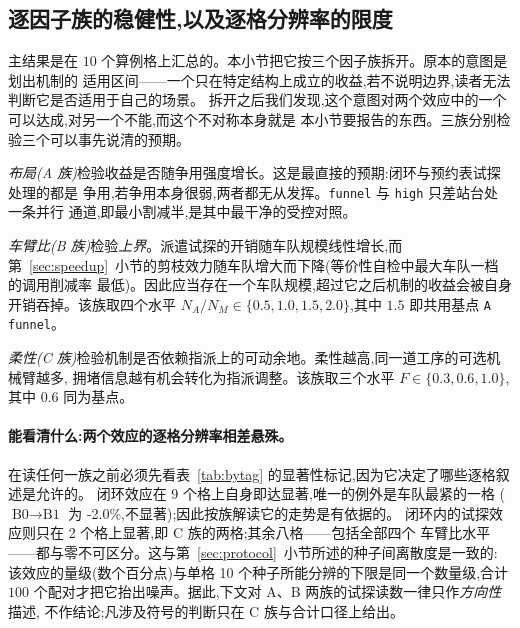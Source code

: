 \documentclass[manuscript,screen,review]{acmart}
\newcommand{\NCases}{10}
\newcommand{\NSeeds}{10}
\newcommand{\NPairs}{100}
\newcommand{\CellsSigLoop}{9}
\newcommand{\CellsSigProbe}{2}
\newcommand{\GainLoopStarve}{-2.0\%}     %
\begin{document}
\subsection{逐因子族的稳健性,以及逐格分辨率的限度}
\label{sec:whichcongestion}

主结果是在 $\NCases$ 个算例格上汇总的。本小节把它按三个因子族拆开。原本的意图是划出机制的
适用区间——一个只在特定结构上成立的收益,若不说明边界,读者无法判断它是否适用于自己的场景。
拆开之后我们发现,这个意图对两个效应中的一个可以达成,对另一个不能,而这个不对称本身就是
本小节要报告的东西。三族分别检验三个可以事先说清的预期。

\emph{布局(A 族)}检验收益是否随争用强度增长。这是最直接的预期:闭环与预约表试探处理的都是
争用,若争用本身很弱,两者都无从发挥。\texttt{funnel} 与 \texttt{high} 只差站台处一条并行
通道,即最小割减半,是其中最干净的受控对照。

\emph{车臂比(B 族)}检验\emph{上界}。派遣试探的开销随车队规模线性增长,而
第~\ref{sec:speedup}~小节的剪枝效力随车队增大而下降(等价性自检中最大车队一档的调用削减率
最低)。因此应当存在一个车队规模,超过它之后机制的收益会被自身开销吞掉。该族取四个水平
$N_A/N_M\in\{0.5,1.0,1.5,2.0\}$,其中 $1.5$ 即共用基点 \texttt{A funnel}。

\emph{柔性(C 族)}检验机制是否依赖指派上的可动余地。柔性越高,同一道工序的可选机械臂越多,
拥堵信息越有机会转化为指派调整。该族取三个水平 $F\in\{0.3,0.6,1.0\}$,其中 $0.6$ 同为基点。

\paragraph{能看清什么:两个效应的逐格分辨率相差悬殊。}
在读任何一族之前必须先看表~\ref{tab:bytag} 的显著性标记,因为它决定了哪些逐格叙述是允许的。
闭环效应在 \CellsSigLoop{} 个格上自身即达显著,唯一的例外是车队最紧的一格
($\text{B0}\to\text{B1}$ 为 \GainLoopStarve{},不显著);因此按族解读它的走势是有依据的。
闭环内的试探效应则只在 \CellsSigProbe{} 个格上显著,即 C 族的两格;其余八格——包括全部四个
车臂比水平——都与零不可区分。这与第~\ref{sec:protocol}~小节所述的种子间离散度是一致的:
该效应的量级(数个百分点)与单格 \NSeeds{} 个种子所能分辨的下限是同一个数量级,合计
$\NPairs$ 个配对才把它抬出噪声。据此,下文对 A、B 两族的试探读数一律只作\emph{方向性}描述,
不作结论;凡涉及符号的判断只在 C 族与合计口径上给出。

\begin{table}[t]
\caption{逐算例格的四级阶梯结果与两个主效应,按三个因子族分组($n=\NSeeds$ 个按种子配对的
比较每格;$^{*}p<0.05$,$^{**}p<0.01$)。争用强度由算例结构决定,一并列出以便判断收益是否
随其变化。负值表示完工时间下降。两个增益列与表~\ref{tab:main} 用同一个估计量,即逐对相对
增益在种子上的均值,因此十格的均值精确等于表~\ref{tab:main} 的合计值;代价是该列不能由
同一行的两个均值列相除反推。\texttt{A funnel} 一行同时是 B 族的 $N_A/N_M=1.5$ 与 C 族的
$F=0.6$,只运行一次,故只列一行。}
\label{tab:bytag}
\small

\end{table}
\end{document}
